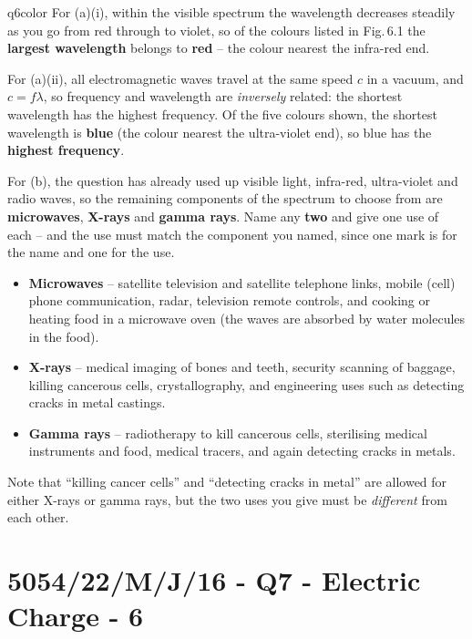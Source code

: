\documentclass[11pt,a4paper]{article}
\newcommand{\examq}[4]{\section[#1 - Q#2]{#1 - Q#2 - #3 - #4}}
\begin{document}
\begin{ansbox}{q6color}
For (a)(i), within the visible spectrum the wavelength decreases steadily as you go from red through to violet, so of the colours listed in Fig.\,6.1 the \textbf{largest wavelength} belongs to \textbf{red} -- the colour nearest the infra-red end.

For (a)(ii), all electromagnetic waves travel at the same speed $c$ in a vacuum, and $c = f\lambda$, so frequency and wavelength are \emph{inversely} related: the shortest wavelength has the highest frequency. Of the five colours shown, the shortest wavelength is \textbf{blue} (the colour nearest the ultra-violet end), so blue has the \textbf{highest frequency}.

For (b), the question has already used up visible light, infra-red, ultra-violet and radio waves, so the remaining components of the spectrum to choose from are \textbf{microwaves}, \textbf{X-rays} and \textbf{gamma rays}. Name any \textbf{two} and give one use of each -- and the use must match the component you named, since one mark is for the name and one for the use.

\begin{itemize}[nosep,leftmargin=*]
\item \textbf{Microwaves} -- satellite television and satellite telephone links, mobile (cell) phone communication, radar, television remote controls, and cooking or heating food in a microwave oven (the waves are absorbed by water molecules in the food).
\item \textbf{X-rays} -- medical imaging of bones and teeth, security scanning of baggage, killing cancerous cells, crystallography, and engineering uses such as detecting cracks in metal castings.
\item \textbf{Gamma rays} -- radiotherapy to kill cancerous cells, sterilising medical instruments and food, medical tracers, and again detecting cracks in metals.
\end{itemize}

Note that ``killing cancer cells'' and ``detecting cracks in metal'' are allowed for either X-rays or gamma rays, but the two uses you give must be \emph{different} from each other.
\end{ansbox}

\examq{5054/22/M/J/16}{7}{Electric Charge}{6}
\end{document}
